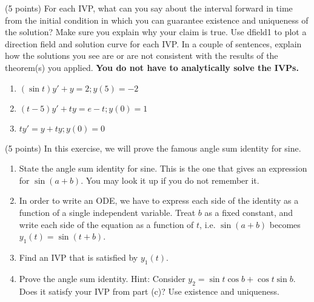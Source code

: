 \documentclass[11pt,letterpaper,boxed]{hmcpset}
\renewcommand{\v}[1]{\textbf{#1}}
\begin{document}
\pagebreak
\hfill
\pagebreak


\begin{problem}[6]
(5 points) For each IVP, what can you say about the interval forward in time from the initial condition in which you can guarantee existence and uniqueness of the solution? Make sure you explain why your claim is true. Use dfield1 to plot a direction field and solution curve for each IVP. In a couple of sentences, explain how the solutions you see are or are not consistent with the results of the theorem(s) you applied. \v{You do not have to analytically solve the IVPs.}
\begin{enumerate}
\item $(\sin t)y' +y=2; y(5)=-2$
\item$(t - 5)y' + ty = e-t; y(0) = 1$
\item$ty' =y+ty; y(0)=0$
\end{enumerate}
\end{problem}


\pagebreak


\begin{problem}[7]
(5 points) In this exercise, we will prove the famous angle sum identity for sine.
\begin{enumerate}
\item State the angle sum identity for sine. This is the one that gives an expression for $\sin(a + b)$. You may look it up if you do not remember it.
\item In order to write an ODE, we have to express each side of the identity as a function of a single independent variable. Treat $b$ as a fixed constant, and write each side of the equation as a function of $t$, i.e. $\sin(a + b)$ becomes $y_1(t) = \sin(t + b)$.
\item Find an IVP that is satisfied by $y_1(t)$.
\item Prove the angle sum identity. Hint: Consider $y_2 = \sin t \cos b + \cos t \sin b$. Does it satisfy
your IVP from part (c)? Use existence and uniqueness.
\end{enumerate}
\end{problem}

\end{document}
